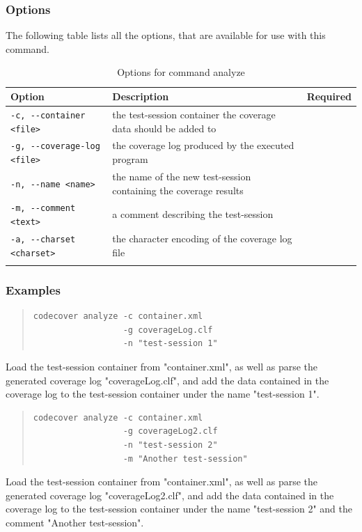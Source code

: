 \subsubsection{Options}\label{command:an:options}
The following table lists all the options, that are available for use with this command.
\begin{longtable}{|l|p{4cm}|c|}\hline
   {\textbf{Option}} & 
   {\textbf{Description}} & 
   {\textbf{Required}} \\\hline \hline \endhead
   \verb$-c, --container <file>$ & the test-session container the coverage data should be added to & \x \\\hline
   \verb$-g, --coverage-log <file>$ & the coverage log produced by the executed program & \x  \\\hline
   \verb$-n, --name <name>$ & the name of the new test-session containing the coverage results & \x \\\hline
   \verb$-m, --comment <text>$ & a comment describing the test-session & \\\hline
   \verb$-a, --charset <charset>$ & the character encoding of the coverage log file & \\\hline
  \caption{Options for command analyze}
  \label{fr_tb:Options for command analyze}
\end{longtable}

\subsubsection{Examples}\label{command:an:examples}
\begin{quote}
\begin{verbatim}
codecover analyze -c container.xml
                  -g coverageLog.clf
                  -n "test-session 1" 
\end{verbatim}
\end{quote}
Load the test-session container from "container.xml", as well as parse the generated coverage log "coverageLog.clf", and add the data contained in the coverage log to the test-session container under the name "test-session 1".
\begin{quote}
\begin{verbatim}
codecover analyze -c container.xml 
                  -g coverageLog2.clf 
                  -n "test-session 2"
                  -m "Another test-session"
\end{verbatim}
\end{quote}
Load the test-session container from "container.xml", as well as parse the generated coverage log "coverageLog2.clf", and add the data contained in the coverage log to the test-session container under the name "test-session 2" and the comment "Another test-session".

